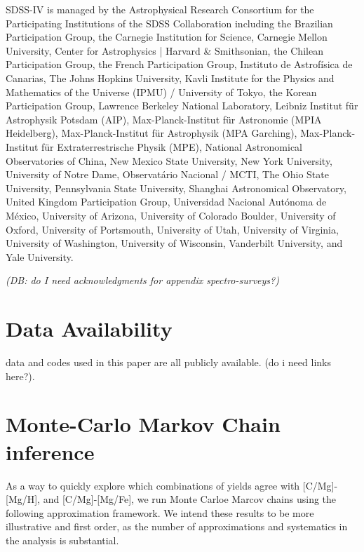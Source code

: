 \documentclass[fleqn,
usenatbib]{mnras}
\newcommand{\caah}{[C/Mg]-[Mg/H]}
\newcommand{\caafe}{[C/Mg]-[Mg/Fe]}
\newcommand{\dbadd}[1]{{\color{Thistle} #1}}
\newcommand{\dbnote}[1]{ {\color{Thistle} \textit{\small (DB: #1)}} }
\begin{document}
SDSS-IV is managed by the 
Astrophysical Research Consortium 
for the Participating Institutions 
of the SDSS Collaboration including 
the Brazilian Participation Group, 
the Carnegie Institution for Science, 
Carnegie Mellon University, Center for 
Astrophysics | Harvard \& 
Smithsonian, the Chilean Participation 
Group, the French Participation Group, 
Instituto de Astrof\'isica de 
Canarias, The Johns Hopkins 
University, Kavli Institute for the 
Physics and Mathematics of the 
Universe (IPMU) / University of 
Tokyo, the Korean Participation Group, 
Lawrence Berkeley National Laboratory, 
Leibniz Institut f\"ur Astrophysik 
Potsdam (AIP),  Max-Planck-Institut 
f\"ur Astronomie (MPIA Heidelberg), 
Max-Planck-Institut f\"ur 
Astrophysik (MPA Garching), 
Max-Planck-Institut f\"ur 
Extraterrestrische Physik (MPE), 
National Astronomical Observatories of 
China, New Mexico State University, 
New York University, University of 
Notre Dame, Observat\'ario 
Nacional / MCTI, The Ohio State 
University, Pennsylvania State 
University, Shanghai 
Astronomical Observatory, United 
Kingdom Participation Group, 
Universidad Nacional Aut\'onoma 
de M\'exico, University of Arizona, 
University of Colorado Boulder, 
University of Oxford, University of 
Portsmouth, University of Utah, 
University of Virginia, University 
of Washington, University of 
Wisconsin, Vanderbilt University, 
and Yale University.

\dbnote{do I need acknowledgments for appendix spectro-surveys?}

\section*{Data Availability}

\dbadd{data and codes used in this paper are all publicly available. (do i need links here?). }







\appendix


\section{Monte-Carlo Markov Chain inference}

As a way to quickly explore which combinations of yields agree with \caah, and \caafe, we run Monte Carloe Marcov chains using the following approximation framework. We intend these results to be more illustrative and first order, as the number of approximations and systematics in the analysis is substantial. 
\end{document}

